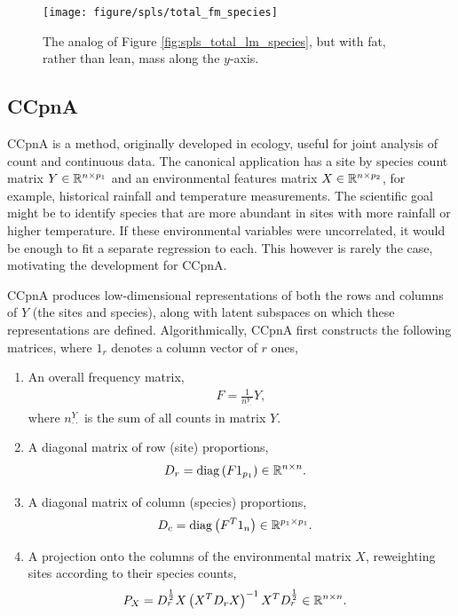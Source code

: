 \documentclass[14pt]{extarticle}
\begin{document}
\begin{figure}
  \centering
  \texttt{[image: figure/spls/total\_fm\_species]}
  \caption{The analog of Figure \ref{fig:spls_total_lm_species}, but with fat,
    rather than lean, mass along the $y$-axis. \label{fig:spls_total_fm_species}
  }
\end{figure}

\subsection{CCpnA}
\label{subsec:canonical-correspondence}

CCpnA is a method, originally developed in ecology, useful for joint analysis of
count and continuous data. The canonical application has a site by species count
matrix $Y \in \mathbb{R}^{n \times p_{1}}$ and an environmental features matrix $X
\in \mathbb{R}^{n \times p_{2}}$, for example, historical rainfall and temperature
measurements. The scientific goal might be to identify species that are more
abundant in sites with more rainfall or higher temperature. If these
environmental variables were uncorrelated, it would be enough to fit a separate
regression to each. This however is rarely the case, motivating the development
for CCpnA.

CCpnA produces low-dimensional representations of both the rows and columns of
$Y$ (the sites and species), along with latent subspaces on which these
representations are defined. Algorithmically, CCpnA first constructs the
following matrices, where $1_{r}$ denotes a column vector of $r$ ones,
\begin{enumerate}
  \item An overall frequency matrix,
    \begin{align*}
      F = \frac{1}{n_{\cdot\cdot}^{Y}} Y,
  \end{align*}
  where $n_{\cdot\cdot}^{Y}$ is the sum of all counts in matrix
  $Y$.
\item A diagonal matrix of row (site) proportions,
  \begin{align*}
    D_{r} &= \mathop\mathrm{diag}\left(F 1_{p_{1}}\right) \in \mathbb{R}^{n \times n}.
  \end{align*}
\item A diagonal matrix of column (species) proportions,
  \begin{align*}
    D_{c} &= \mathop\mathrm{diag}\left(F^{T}1_{n}\right) \in \mathbb{R}^{p_{1} \times p_{1}}.
  \end{align*}
\item A projection onto the columns of the environmental matrix
  $X$, reweighting sites according to their species counts,
  \begin{align*}
    P_{X} &= D_{r}^{\frac{1}{2}}X\left(X^{T}D_{r}X\right)^{-1}X^{T}D_{r}^{\frac{1}{2}} \in
  \mathbb{R}^{n \times n}.
\end{align*}
\end{enumerate}
\end{document}
